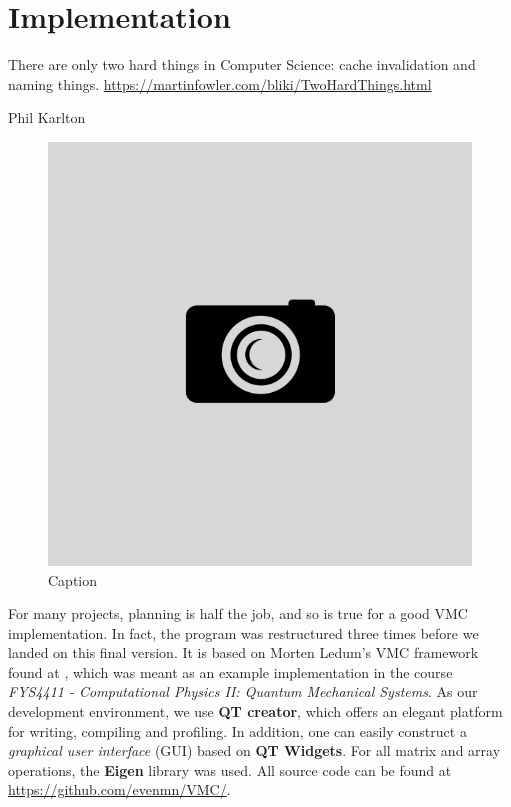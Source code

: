 \chapter{Implementation} \label{sec:implementation}
\epigraph{There are only two hard things in Computer Science: cache invalidation and naming things. \url{https://martinfowler.com/bliki/TwoHardThings.html}}{Phil Karlton}
\begin{figure}[H]
	\centering
	\includegraphics[scale=0.4]{Images/example.png}
	\caption{Caption}
\end{figure}

For many projects, planning is half the job, and so is true for a good VMC implementation. In fact, the program was restructured three times before we landed on this final version. It is based on Morten Ledum's VMC framework found at \cite{ledumFramework}, which was meant as an example implementation in the course \textit{FYS4411 - Computational Physics II: Quantum Mechanical Systems}. As our development environment, we use \textbf{QT creator}, which offers an elegant platform for writing, compiling and profiling. In addition, one can easily construct a \textit{graphical user interface} (GUI) based on \textbf{QT Widgets}. For all matrix and array operations, the \textbf{Eigen} library was used. All source code can be found at \url{https://github.com/evenmn/VMC/}. \bigskip

